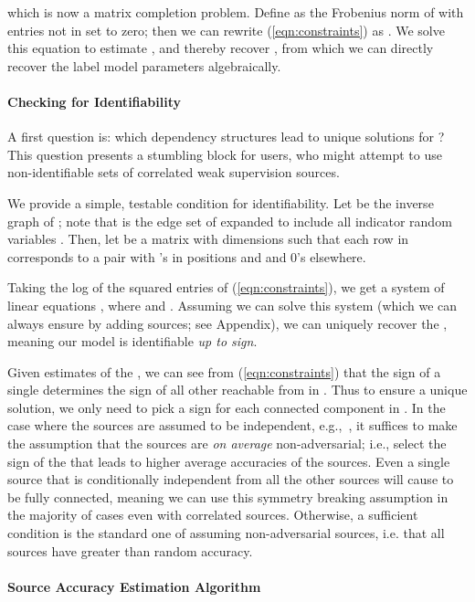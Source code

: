 \documentclass[letterpaper]{article}
\begin{document}
which is now a matrix completion problem.
Define  as the Frobenius norm of  with entries not in  set to zero; then we can rewrite (\ref{eqn:constraints}) as .
We solve this equation to estimate , and thereby recover , from which we can directly recover the label model parameters  algebraically.

\paragraph*{Checking for Identifiability}
A first question is: which dependency structures  lead to unique solutions for ?
This question presents a stumbling block for users, who might attempt to use non-identifiable sets of correlated weak supervision sources.

We provide a simple, testable condition for identifiability.
Let  be the inverse graph of ; note that  is the edge set of  expanded to include all indicator random variables .
Then, let  be a matrix with dimensions  such that each row in  corresponds to a pair  with 's in positions  and  and 0's elsewhere.

Taking the log of the squared entries of (\ref{eqn:constraints}), we get a system of linear equations ,
where  and .
Assuming we can solve this system (which we can always ensure by adding sources; see Appendix), we can uniquely recover the , meaning our model is identifiable \textit{up to sign}.

Given estimates of the , we can see from (\ref{eqn:constraints}) that the sign of a single  determines the sign of all other  reachable from  in .
Thus to ensure a unique solution, we only need to pick a sign for each connected component in  .
In the case where the sources are assumed to be independent, e.g.,~\cite{Dalvi:2013:ACB:2488388.2488414,zhang2014spectral,dawid1979maximum}, it
suffices to make the assumption that the sources are {\em on average} non-adversarial; i.e., select the sign of the  that leads to higher average accuracies of the sources.
Even a single source that is conditionally independent from all the other sources will cause  to be fully connected, meaning we can use this symmetry breaking assumption in the majority of cases even with correlated sources.
Otherwise, a sufficient condition is the standard one of assuming non-adversarial sources, i.e. that all sources have greater than random accuracy.


\paragraph*{Source Accuracy Estimation Algorithm}
\end{document}
